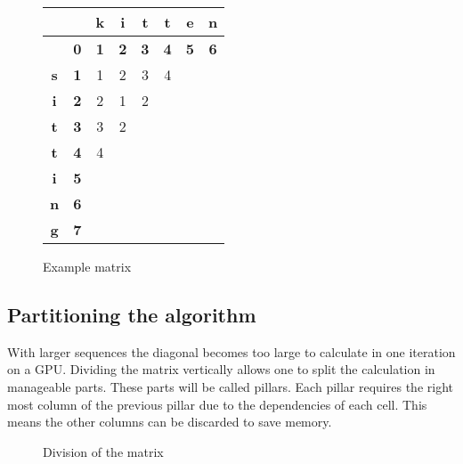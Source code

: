 {\newcommand\C[0]{\cellcolor{gray}}
\begin{figure}
\centering \large
\begin{tabular}{|c|c||c|c|c|c|c|c|} \hline
           &            & \textbf{k} & \textbf{i} & \textbf{t} & \textbf{t} & \textbf{e} & \textbf{n} \\ \hline
           & \textbf{0} & \textbf{1} & \textbf{2} & \textbf{3} & \textbf{4} & \textbf{5} & \textbf{6} \\ \hline \hline
\textbf{s} & \textbf{1} & 1          & 2          & 3          & 4          & \C         &            \\ \hline
\textbf{i} & \textbf{2} & 2          & 1          & 2          & \C         &            &            \\ \hline
\textbf{t} & \textbf{3} & 3          & 2          & \C         &            &            &            \\ \hline
\textbf{t} & \textbf{4} & 4          & \C         &            &            &            &            \\ \hline
\textbf{i} & \textbf{5} & \C         &            &            &            &            &            \\ \hline
\textbf{n} & \textbf{6} &            &            &            &            &            &            \\ \hline
\textbf{g} & \textbf{7} &            &            &            &            &            &            \\ \hline
\end{tabular}
\caption{Example matrix} \label{diagonal}
\end{figure}
}

\subsection{Partitioning the algorithm} \label{partitioning}
With larger sequences the diagonal becomes too large to calculate in one iteration on a GPU.
Dividing the matrix vertically allows one to split the calculation in manageable parts.
These parts will be called pillars.
Each pillar requires the right most column of the previous pillar due to the dependencies of each cell.
This means the other columns can be discarded to save memory.

\begin{figure}
    \centering
    
    \caption{Division of the matrix} \label{division}
\end{figure}

